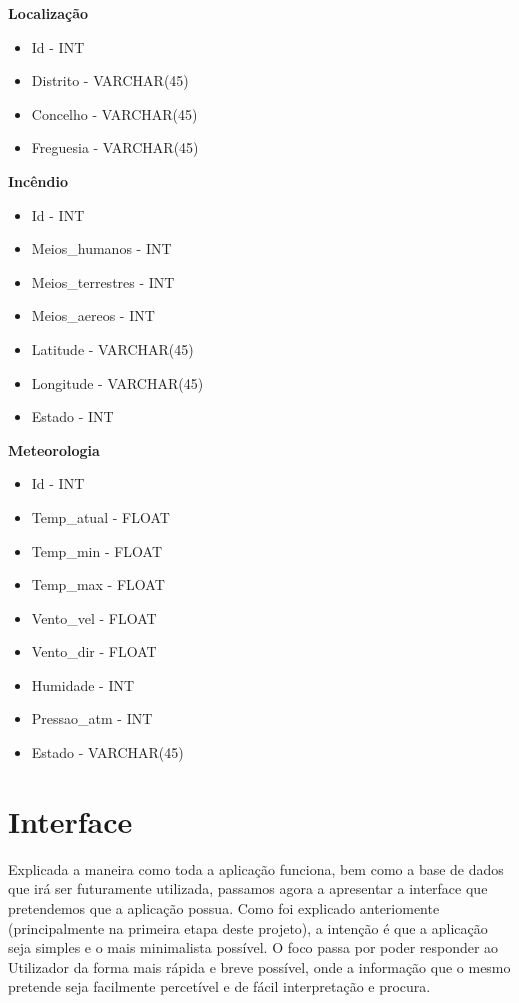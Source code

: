 \documentclass[a4paper,12pt]{scrreprt}
\newcommand{\tab}{
    \hspace{1cm}}
\begin{document}
\textbf{Localização}

\begin{itemize}
    \item Id - INT
    \item Distrito - VARCHAR(45)
    \item Concelho - VARCHAR(45)
    \item Freguesia - VARCHAR(45)
\end{itemize}

\textbf{Incêndio}

\begin{itemize}
    \item Id - INT
    \item Meios\_humanos - INT
    \item Meios\_terrestres - INT
    \item Meios\_aereos - INT
    \item Latitude - VARCHAR(45)
    \item Longitude - VARCHAR(45)
    \item Estado - INT
\end{itemize}

\textbf{Meteorologia}

\begin{itemize}
    \item Id - INT
    \item Temp\_atual - FLOAT
    \item Temp\_min - FLOAT
    \item Temp\_max - FLOAT
    \item Vento\_vel - FLOAT
    \item Vento\_dir - FLOAT
    \item Humidade - INT
    \item Pressao\_atm - INT
    \item Estado - VARCHAR(45)
\end{itemize}


\chapter{Interface}

\tab Explicada a maneira como toda a aplicação funciona, bem como a base de dados que irá ser futuramente utilizada, passamos agora a apresentar a interface que pretendemos que a aplicação possua. Como foi explicado anteriomente (principalmente na primeira etapa deste projeto), a intenção é que a aplicação seja simples e o mais minimalista possível. O foco passa por poder responder ao Utilizador da forma mais rápida e breve possível, onde a informação que o mesmo pretende seja facilmente percetível e de fácil interpretação e procura. 
\end{document}

